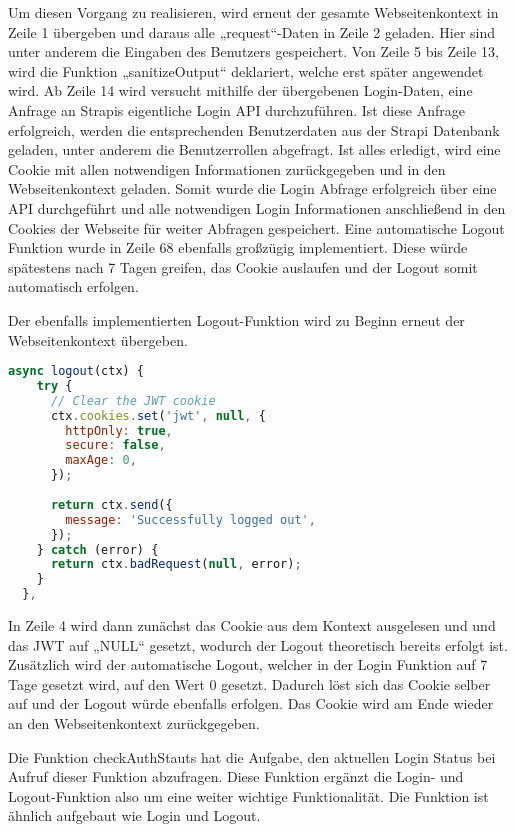 Um diesen Vorgang zu realisieren, wird erneut der gesamte Webseitenkontext in Zeile 1 übergeben und daraus alle „request“-Daten in Zeile 2 geladen. Hier sind unter anderem die Eingaben des Benutzers gespeichert.
Von Zeile 5 bis Zeile 13, wird die Funktion „sanitizeOutput“ deklariert, welche erst später angewendet wird.
Ab Zeile 14 wird versucht mithilfe der übergebenen Login-Daten, eine Anfrage an Strapis eigentliche Login API durchzuführen. Ist diese Anfrage erfolgreich, werden die entsprechenden Benutzerdaten aus der Strapi Datenbank geladen, unter anderem die Benutzerrollen abgefragt.
Ist alles erledigt, wird eine Cookie mit allen notwendigen Informationen zurückgegeben und in den Webseitenkontext geladen.
Somit wurde die Login Abfrage erfolgreich über eine API durchgeführt und alle notwendigen Login Informationen anschließend in den Cookies der Webseite für weiter Abfragen gespeichert. Eine automatische Logout Funktion wurde in Zeile 68 ebenfalls großzügig implementiert. Diese würde spätestens nach 7 Tagen greifen, das Cookie auslaufen und der Logout somit automatisch erfolgen.

Der ebenfalls implementierten Logout-Funktion wird zu Beginn erneut der Webseitenkontext übergeben.

\begin{lstlisting}[language=JavaScript, caption={Logout-Funktion}, label={lst:customjsLogout}]
async logout(ctx) {
    try {
      // Clear the JWT cookie
      ctx.cookies.set('jwt', null, {
        httpOnly: true,
        secure: false,
        maxAge: 0,
      });
      
      return ctx.send({
        message: 'Successfully logged out',
      });
    } catch (error) {
      return ctx.badRequest(null, error);
    }
  },
\end{lstlisting}

In Zeile 4 wird dann zunächst das Cookie aus dem Kontext ausgelesen und und das JWT auf „NULL“ gesetzt, wodurch der Logout theoretisch bereits erfolgt ist. Zusätzlich wird der automatische Logout, welcher in der Login Funktion auf 7 Tage gesetzt wird, auf den Wert 0 gesetzt.
Dadurch löst sich das Cookie selber auf und der Logout würde ebenfalls erfolgen. Das Cookie wird am Ende wieder an den Webseitenkontext zurückgegeben.

Die Funktion checkAuthStauts hat die Aufgabe, den aktuellen Login Status bei Aufruf dieser Funktion abzufragen. Diese Funktion ergänzt die Login- und Logout-Funktion also um eine weiter wichtige Funktionalität.
Die Funktion ist ähnlich aufgebaut wie Login und Logout.

